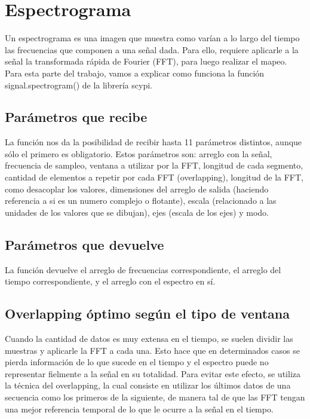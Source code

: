 \documentclass[../ASSD_TP2.tex]{subfiles}
\begin{document}
\section{Espectrograma}

Un espectrograma es una imagen que muestra como varían a lo largo
del tiempo las frecuencias que componen a una señal dada. Para ello,
requiere aplicarle a la señal la transformada rápida de Fourier (FFT),
para luego realizar el mapeo. Para esta parte del trabajo, vamos a
explicar como funciona la función signal.spectrogram() de la librería
scypi.

\subsection{Parámetros que recibe}

La función nos da la posibilidad de recibir hasta 11 parámetros distintos,
aunque sólo el primero es obligatorio. Estos parámetros son: arreglo
con la señal, frecuencia de sampleo, ventana a utilizar por la FFT,
longitud de cada segmento, cantidad de elementos a repetir por cada
FFT (overlapping), longitud de la FFT, como desacoplar los valores,
dimensiones del arreglo de salida (haciendo referencia a si es un
numero complejo o flotante), escala (relacionado a las unidades de
los valores que se dibujan), ejes (escala de los ejes) y modo.

\subsection{Parámetros que devuelve}

La función devuelve el arreglo de frecuencias correspondiente, el
arreglo del tiempo correspondiente, y el arreglo con el espectro en
sí.

\subsection{Overlapping óptimo según el tipo de ventana}

Cuando la cantidad de datos es muy extensa en el tiempo, se suelen
dividir las muestras y aplicarle la FFT a cada una. Esto hace que
en determinados casos se pierda información de lo que sucede en el
tiempo y el espectro puede no representar fielmente a la señal en
su totalidad. Para evitar este efecto, se utiliza la técnica del overlapping,
la cual consiste en utilizar los últimos datos de una secuencia como
los primeros de la siguiente, de manera tal de que las FFT tengan
una mejor referencia temporal de lo que le ocurre a la señal en el
tiempo. 
\end{document}
